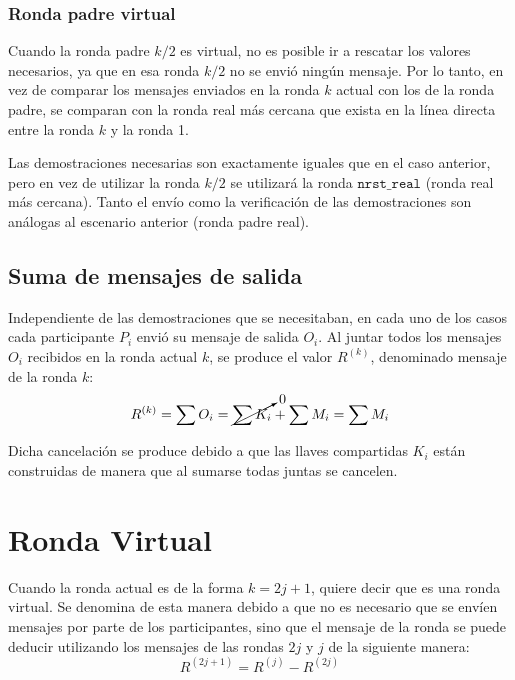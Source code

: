 \subsubsection{Ronda padre virtual}

Cuando la ronda padre $k/2$ es virtual, no es posible ir a rescatar los valores 
necesarios, ya que en esa ronda $k/2$ no se envió ningún mensaje. Por lo tanto, 
en vez de comparar los mensajes enviados en la ronda $k$ actual con los de la 
ronda padre, se comparan con la ronda real más cercana que exista en la línea 
directa entre la ronda $k$ y la ronda 1. 


Las demostraciones necesarias son exactamente iguales que en el caso anterior, 
pero en vez de utilizar la ronda $k/2$ se utilizará la ronda $\mathtt{nrst\_real}$ 
(ronda real más cercana). Tanto el envío como la verificación de las demostraciones 
son análogas al escenario anterior (ronda padre real).

\subsection{Suma de mensajes de salida}

Independiente de las demostraciones que se necesitaban, en cada uno de los casos 
cada participante $P_i$ envió su mensaje de salida $O_i$. Al juntar todos los 
mensajes $O_i$ recibidos en la ronda actual $k$, se produce el valor $R^{(k)}$, 
denominado mensaje de la ronda 
$k$: $$R^{(k)} = \sum O_i = \cancelto{0}{\sum K_i} + \sum M_i = \sum M_i$$

Dicha cancelación se produce debido a que las llaves compartidas $K_i$ están 
construidas de manera que al sumarse todas juntas se cancelen.

\section{Ronda Virtual}

Cuando la ronda actual es de la forma $k = 2j + 1$, quiere decir que es una ronda 
virtual. Se denomina de esta manera debido a que no es necesario que se envíen 
mensajes por parte de los participantes, sino que el mensaje de la ronda se puede 
deducir utilizando los mensajes de las rondas $2j$ y $j$ de la siguiente manera: 
$$R^{(2j + 1)} = R^{(j)} - R^{(2j)}$$


